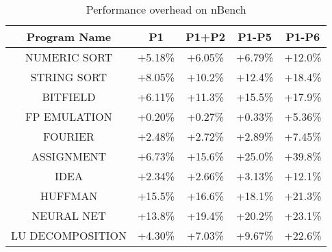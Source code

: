 \begin{table}[htbp]
\footnotesize
\caption{Performance overhead on nBench}\label{tb-nben-perf}
\vspace{-5pt}
\begin{center}
\begin{tabular}{|c|c|c|c|c|}
\hline
\textbf{Program Name} & \textbf{P1} & \textbf{P1+P2} & \textbf{P1-P5} & \textbf{P1-P6}\\
\hline
NUMERIC SORT  & +5.18\% & +6.05\% & +6.79\% & +12.0\% \\
\hline
STRING SORT  & +8.05\% & +10.2\% & +12.4\%  & +18.4\% \\
\hline
BITFIELD  & +6.11\% & +11.3\% & +15.5\% & +17.9\% \\
\hline
FP EMULATION  & +0.20\% & +0.27\% & +0.33\% & +5.36\% \\
\hline
FOURIER & +2.48\% & +2.72\% & +2.89\% & +7.45\% \\
\hline
ASSIGNMENT & +6.73\% & +15.6\% & +25.0\% & +39.8\% \\
\hline
IDEA & +2.34\% & +2.66\% & +3.13\% & +12.1\% \\
\hline
HUFFMAN & +15.5\% & +16.6\% & +18.1\% & +21.3\% \\
\hline
NEURAL NET  & +13.8\% & +19.4\% & +20.2\% & +23.1\% \\
\hline
LU DECOMPOSITION  & +4.30\% & +7.03\% & +9.67\% & +22.6\% \\
\hline
\end{tabular}
\end{center}
\vspace{-10pt}
\end{table}